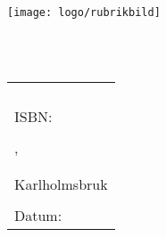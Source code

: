 \pagestyle{empty}

\vfill
\vspace*{4cm}

\hspace{-30.5mm}\texttt{[image: logo/rubrikbild]}

\begin{flushright}
	\Huge{\bfseries{\TitleText}} \\[3mm]
	\Large{\bfseries{\SubtitleText}}\\[3mm]
        \normalsize{\DokVersion}
\end{flushright}

\listoftodos

\newpage



\vspace*{\fill}

\small

\begin{tabular}{l}
	{\bf \TitleText}                  \\
	\noindent \SubtitleText           \\
	                                  \\
	\noindent \DokVersion             \\
	\noindent ISBN: \ISBN             \\
	                                  \\
	\noindent \Forfattare, \Initialer \\
	\noindent \Epostadress            \\
	\noindent \Linkhome               \\
	\noindent Karlholmsbruk           \\
	                                  \\
	\noindent Datum: \DokumentDatum
\end{tabular}
\normalsize

\clearpage




\renewcommand{\headrulewidth}{0.2 pt}
\renewcommand{\footrulewidth}{0.2 pt}

\fancyhead[RE]{\small\nouppercase{\leftmark}}      %
\fancyhead[RO]{\small\nouppercase{\rightmark}}     %
\fancyhead[LE]{\small\nouppercase{\rightmark}}      %
\fancyhead[LO]{\small\nouppercase{\leftmark}}     %


